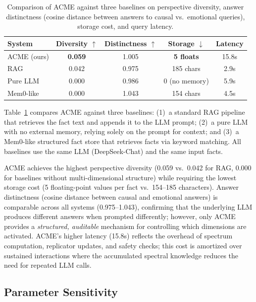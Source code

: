 \documentclass[review]{elsarticle}
\begin{document}
\begin{table}[t]
\centering
\caption{Comparison of ACME against three baselines on perspective diversity,
answer distinctness (cosine distance between answers to causal vs.\ emotional
queries), storage cost, and query latency.}
\label{tab:baselines}
\begin{tabular}{lcccc}
\toprule
\textbf{System} & \textbf{Diversity} $\uparrow$ & \textbf{Distinctness} $\uparrow$ & \textbf{Storage} $\downarrow$ & \textbf{Latency} \\
\midrule
ACME (ours) & \textbf{0.059} & 1.005 & \textbf{5 floats} & 15.8s \\
RAG & 0.042 & 0.975 & 185 chars & 2.9s \\
Pure LLM & 0.000 & 0.986 & 0 (no memory) & 5.9s \\
Mem0-like & 0.000 & 1.043 & 154 chars & 4.5s \\
\bottomrule
\end{tabular}
\end{table}

Table~\ref{tab:baselines} compares ACME against three baselines: (1)~a standard
RAG pipeline that retrieves the fact text and appends it to the LLM prompt;
(2)~a pure LLM with no external memory, relying solely on the prompt for
context; and (3)~a Mem0-like structured fact store that retrieves facts via
keyword matching. All baselines use the same LLM (DeepSeek-Chat) and the same
input facts.

ACME achieves the highest perspective diversity (0.059 vs.\ 0.042 for RAG,
0.000 for baselines without multi-dimensional structure) while requiring
the lowest storage cost (5 floating-point values per fact vs.\ 154--185
characters). Answer distinctness (cosine distance between causal and emotional
answers) is comparable across all systems (0.975--1.043), confirming that the
underlying LLM produces different answers when prompted differently; however,
only ACME provides a \emph{structured, auditable} mechanism for controlling
which dimensions are activated. ACME's higher latency (15.8s) reflects the
overhead of spectrum computation, replicator updates, and safety checks; this
cost is amortized over sustained interactions where the accumulated spectral
knowledge reduces the need for repeated LLM calls.

\subsection{Parameter Sensitivity}
\end{document}
